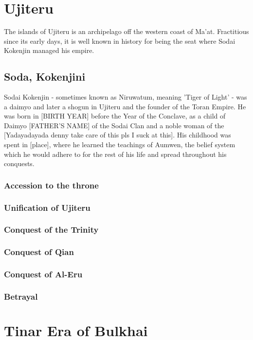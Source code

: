 \begin{multicols}{2}
	\section{Ujiteru}
		The islands of Ujiteru is an archipelago off the western coast of Ma'at. Fractitious since its early days, it is well known in history for being the seat where Sodai Kokenjin managed his empire.
		\subsection{Soda, Kokenjini}
					 
			Sodai Kokenjin - sometimes known as Niruwatum, meaning 'Tiger of Light' - was a daimyo and later a shogun in Ujiteru and the founder of the Toran Empire. He was born in [BIRTH YEAR] before the Year of the Conclave, as a child of Daimyo [FATHER'S NAME] of the Sodai Clan and a noble woman of the [Yadayadayada denny take care of this pls I suck at this]. His childhood was spent in [place], where he learned the teachings of Aumwen, the belief system which he would adhere to for the rest of his life and spread throughout his conquests.\par
			\subsubsection{Accession to the throne}
			\subsubsection{Unification of Ujiteru}
			\subsubsection{Conquest of the Trinity}
			\subsubsection{Conquest of Qian}
			\subsubsection{Conquest of Al-Eru}
			\subsubsection{Betrayal}
	\section{Tinar Era of Bulkhai}
		
\end{multicols}
